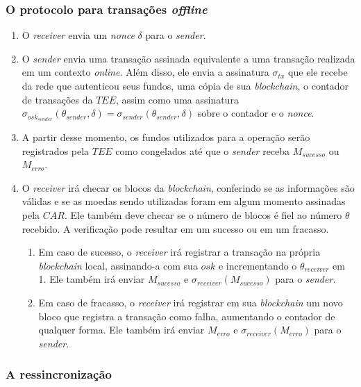 \documentclass[
  12pt,
  a4paper,
  oneside,
  article,
]{abntex2}
\begin{document}
\subsubsection{O protocolo para transações \textit{offline}}

\begin{enumerate}
	\item O \textit{receiver} envia um \textit{nonce} $\delta$ para o \textit{sender}.
	\item O \textit{sender} envia uma transação assinada equivalente a uma transação realizada em um contexto \textit{online}. Além disso, ele envia a assinatura $\sigma_{tx}$ que ele recebe da rede que autenticou seus fundos, uma cópia de sua \textit{blockchain}, o contador de transações da $TEE$, assim como uma assinatura $\sigma_{osk_{sender}}(\theta_{sender}, \delta) = \sigma_{sender} (\theta_{sender}, \delta)$ sobre o contador e o \textit{nonce}.
	\item A partir desse momento, os fundos utilizados para a operação serão registrados pela $TEE$ como congelados até que o \textit{sender} receba $M_{sucesso}$ ou $M_{erro}$.
	\item O \textit{receiver} irá checar os blocos da \textit{blockchain}, conferindo se as informações são válidas e se as moedas sendo utilizadas foram em algum momento assinadas pela $CAR$. Ele também deve checar se o número de blocos é fiel ao número $\theta$ recebido. A verificação pode resultar em um sucesso ou em um fracasso.
	      \begin{enumerate}
		      \item Em caso de sucesso, o \textit{receiver} irá registrar a transação na própria \textit{blockchain} local, assinando-a com sua $osk$ e incrementando o $\theta_{receiver}$ em 1. Ele também irá enviar $M_{sucesso}$ e $\sigma_{receiver}(M_{sucesso})$ para o \textit{sender}.
		      \item Em caso de fracasso, o \textit{receiver} irá registrar em sua \textit{blockchain} um novo bloco que registra a transação como falha, aumentando o contador de qualquer forma. Ele também irá enviar $M_{erro}$ e $\sigma_{receiver}(M_{erro})$ para o \textit{sender}.
	      \end{enumerate}
\end{enumerate}

\subsubsection{A ressincronização}
\label{subsec:ressincronizacao}
\end{document}
